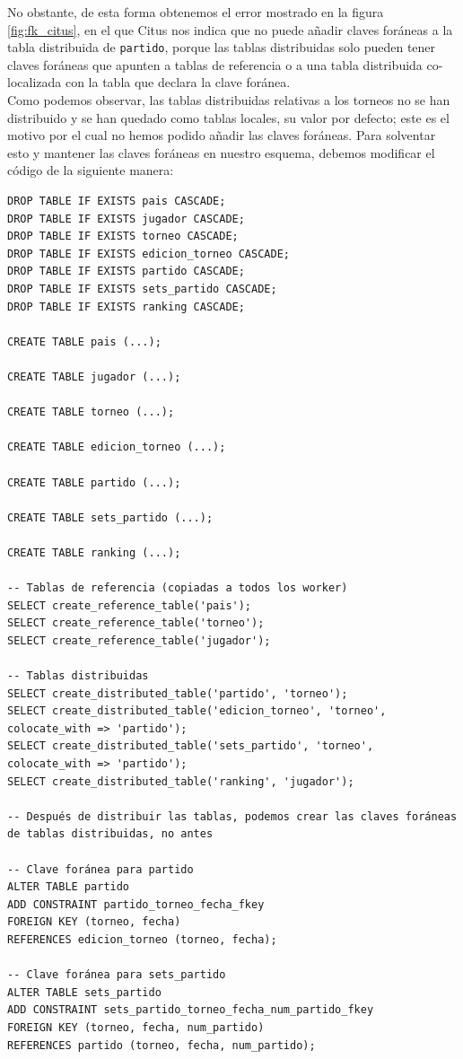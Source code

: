 \noindent No obstante, de esta forma obtenemos el error mostrado en la figura \ref{fig:fk_citus}, en el que Citus nos indica que no puede añadir claves foráneas a la tabla distribuida de \texttt{partido}, porque las tablas distribuidas solo pueden tener claves foráneas que apunten a tablas de referencia o a una tabla distribuida co-localizada con la tabla que declara la clave foránea. \\

Como podemos observar, las tablas distribuidas relativas a los torneos no se han distribuido y se han quedado como tablas locales, su valor por defecto; este es el motivo por el cual no hemos podido añadir las claves foráneas. Para solventar esto y mantener las claves foráneas en nuestro esquema, debemos modificar el código de la siguiente manera:

\begin{verbatim}
DROP TABLE IF EXISTS pais CASCADE;
DROP TABLE IF EXISTS jugador CASCADE;
DROP TABLE IF EXISTS torneo CASCADE;
DROP TABLE IF EXISTS edicion_torneo CASCADE;
DROP TABLE IF EXISTS partido CASCADE;
DROP TABLE IF EXISTS sets_partido CASCADE;
DROP TABLE IF EXISTS ranking CASCADE;

CREATE TABLE pais (...);

CREATE TABLE jugador (...);

CREATE TABLE torneo (...);

CREATE TABLE edicion_torneo (...);

CREATE TABLE partido (...);

CREATE TABLE sets_partido (...);

CREATE TABLE ranking (...);

-- Tablas de referencia (copiadas a todos los worker)
SELECT create_reference_table('pais');
SELECT create_reference_table('torneo');
SELECT create_reference_table('jugador');

-- Tablas distribuidas
SELECT create_distributed_table('partido', 'torneo');
SELECT create_distributed_table('edicion_torneo', 'torneo', colocate_with => 'partido');
SELECT create_distributed_table('sets_partido', 'torneo', colocate_with => 'partido');
SELECT create_distributed_table('ranking', 'jugador');

-- Después de distribuir las tablas, podemos crear las claves foráneas de tablas distribuidas, no antes

-- Clave foránea para partido
ALTER TABLE partido 
ADD CONSTRAINT partido_torneo_fecha_fkey
FOREIGN KEY (torneo, fecha) 
REFERENCES edicion_torneo (torneo, fecha);

-- Clave foránea para sets_partido
ALTER TABLE sets_partido 
ADD CONSTRAINT sets_partido_torneo_fecha_num_partido_fkey
FOREIGN KEY (torneo, fecha, num_partido) 
REFERENCES partido (torneo, fecha, num_partido);
\end{verbatim}

